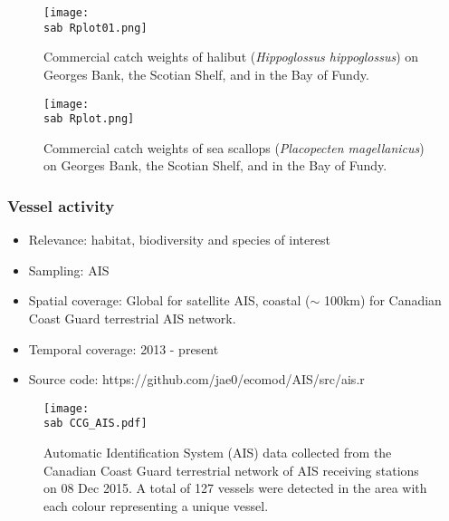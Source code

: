 \documentclass{beamer}
\numberwithin{equation}{section}		%
\numberwithin{figure}{section}		%
\numberwithin{table}{section}				%
\newcommand{\ecomod}{\string~/ecomod_data/}   %
\newcommand{\sab}{\ecomod/mpa/sab/}   %
\begin{document}

\begin{frame}[shrink]
\begin{figure}[h]
	\centering
	\texttt{[image: \\sab Rplot01.png]}
	\caption{Commercial catch weights of halibut (\textit{Hippoglossus hippoglossus}) on Georges Bank, the Scotian Shelf, and in the Bay of Fundy.}
	\label{fig:halibut}
\end{figure}
\end{frame}



\begin{frame}[shrink]
\begin{figure}[h]
	\centering
 \texttt{[image: \\sab Rplot.png]}
	\caption{Commercial catch weights of sea scallops (\textit{Placopecten magellanicus}) on Georges Bank, the Scotian Shelf, and in the Bay of Fundy.}
		\label{fig:Scallop}
\end{figure}
\end{frame}




\begin{frame}[shrink]
\frametitle{Vessel activity}
\begin{itemize}
	\item Relevance:  habitat, biodiversity and species of interest
	\item Sampling:  AIS
	\item Spatial coverage: Global for satellite AIS, coastal ($\sim$ 100km) for Canadian Coast Guard terrestrial AIS network.
	\item Temporal coverage: 2013 - present
	\item Source code: https://github.com/jae0/ecomod/AIS/src/ais.r
\end{itemize}	
\end{frame}



\begin{frame}

\begin{figure}[h]
  \centering
	\texttt{[image: \\sab CCG\_AIS.pdf]}
	\caption{Automatic Identification System (AIS) data collected from the Canadian Coast Guard terrestrial network of AIS receiving stations on 08 Dec 2015. A total of 127 vessels were detected in the area with each colour representing a unique vessel.}
    \label{fig:TAIS}
\end{figure}


\end{frame}
\end{document}
